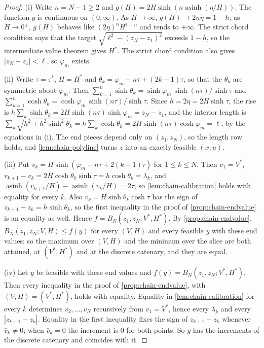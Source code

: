 \begin{proof}
(i) Write $n = N - 1 \ge 2$ and $g(H) = 2H\sinh(n\operatorname{asinh}(\eta/H))$.
The function $g$ is continuous on $(0,\infty)$.
As $H \to \infty$, $g(H) \to 2n\eta = 1 - h$; as $H \to 0^+$, $g(H)$ behaves like $(2\eta)^n H^{1-n}$ and tends to $+\infty$.
The strict chord condition says that the target $\sqrt{\ell^2 - (z_N - z_1)^2}$ exceeds $1 - h$, so the intermediate value theorem gives $H^*$.
The strict chord condition also gives $|z_N - z_1| < \ell$, so $\varphi_m$ exists.

(ii) Write $\tau = \tau^*$, $H = H^*$ and $\theta_k = \varphi_m - n\tau + (2k-1)\tau$, so that the $\theta_k$ are symmetric about $\varphi_m$.
Then $\sum_{k=1}^{n}\sinh\theta_k = \sinh\varphi_m\,\sinh(n\tau)/\sinh\tau$ and $\sum_{k=1}^{n}\cosh\theta_k = \cosh\varphi_m\,\sinh(n\tau)/\sinh\tau$.
Since $h = 2\eta = 2H\sinh\tau$, the rise is $h\sum_k \sinh\theta_k = 2H\sinh(n\tau)\sinh\varphi_m = z_N - z_1$, and the interior length is $\sum_k \sqrt{h^2 + h^2\sinh^2\theta_k} = h\sum_k\cosh\theta_k = 2H\sinh(n\tau)\cosh\varphi_m = \ell$, by the equations in (i).
The end pieces depend only on $(z_1, z_N)$, so the length row holds, and \cref{lem:chain-polyline} turns $z$ into an exactly feasible $(x,u)$.

(iii) Put $v_k = H\sinh(\varphi_m - n\tau + 2(k-1)\tau)$ for $1 \le k \le N$.
Then $v_1 = V^*$, $v_{k+1} - v_k = 2H\cosh\theta_k\sinh\tau = h\cosh\theta_k = \lambda_k$, and $\operatorname{asinh}(v_{k+1}/H) - \operatorname{asinh}(v_k/H) = 2\tau$, so \cref{lem:chain-calibration} holds with equality for every $k$.
Also $\bar v_k = H\sinh\theta_k\cosh\tau$ has the sign of $z_{k+1} - z_k = h\sinh\theta_k$, so the first inequality in the proof of \cref{prop:chain-endvalue} is an equality as well.
Hence $f = B_N(z_1, z_N; V^*, H^*)$.
By \cref{prop:chain-endvalue}, $B_N(z_1, z_N; V, H) \le f(y)$ for every $(V,H)$ and every feasible $y$ with these end values; so the maximum over $(V,H)$ and the minimum over the slice are both attained, at $(V^*, H^*)$ and at the discrete catenary, and they are equal.

(iv) Let $y$ be feasible with these end values and $f(y) = B_N(z_1, z_N; V^*, H^*)$.
Then every inequality in the proof of \cref{prop:chain-endvalue}, with $(V,H) = (V^*,H^*)$, holds with equality.
Equality in \cref{lem:chain-calibration} for every $k$ determines $v_2, \dots, v_N$ recursively from $v_1 = V^*$, hence every $\lambda_k$ and every $|z_{k+1} - z_k|$.
Equality in the first inequality fixes the sign of $z_{k+1} - z_k$ whenever $\bar v_k \ne 0$; when $\bar v_k = 0$ the increment is $0$ for both points.
So $y$ has the increments of the discrete catenary and coincides with it.
\end{proof}

